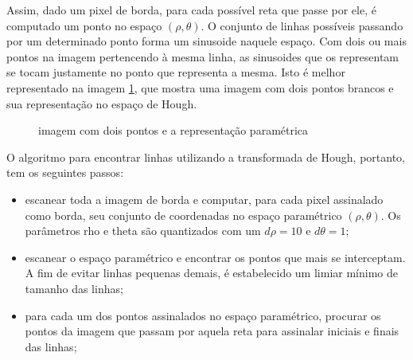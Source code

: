 
Assim, dado um pixel de borda, para cada possível reta que passe por ele, é computado um ponto no espaço $(\rho,\theta)$. O conjunto de linhas possíveis passando por um determinado ponto forma um sinusoide naquele espaço. Com dois ou mais pontos na imagem pertencendo à mesma linha, as sinusoides que os representam se tocam justamente no ponto que representa a mesma. Isto é melhor representado na imagem \ref{houghlinhas}, que mostra uma imagem com dois pontos brancos e sua representação no espaço de Hough.


\begin{figure}[h]
  \centering
  \hfill
  \caption{imagem com dois pontos e a representação paramétrica}
  \label{houghlinhas}
\end{figure}


O algoritmo para encontrar linhas utilizando a transformada de Hough, portanto, tem os seguintes passos: 
\begin{itemize}
\item escanear toda a imagem de borda e computar, para cada pixel assinalado como borda, seu conjunto de coordenadas no espaço paramétrico $(\rho,\theta)$. Os parâmetros rho e theta são quantizados com um $d\rho = 10$ e $d\theta = 1$;
\item escanear o espaço paramétrico e encontrar os pontos que mais se interceptam. A fim de evitar linhas pequenas demais, é estabelecido um limiar mínimo de tamanho das linhas;
\item para cada um dos pontos assinalados no espaço paramétrico, procurar os pontos da imagem que passam por aquela reta para assinalar iniciais e finais das linhas;
\end{itemize}

